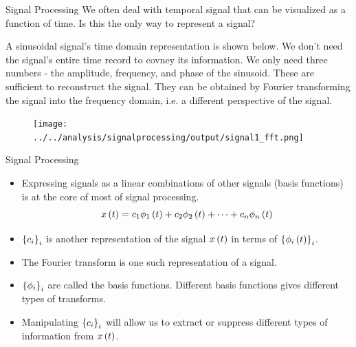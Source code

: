 \documentclass[aspectratio=169]{beamer}
\let\olditem\item
\renewcommand{\item}{\setlength{\itemsep}{\fill}\olditem}
\def\lp{\ensuremath\left(}
\def\rp{\ensuremath\right)}
\def\lc{\ensuremath\left\{}
\def\rc{\ensuremath\right\}}
\newcommand{\ct}[1]{\lp #1\rp}
\begin{document}
\begin{frame}{Signal Processing}
  We often deal with temporal signal that can be visualized as a function of time. Is this the only way to represent a signal?
  \vspace{0.2cm}

  A sinusoidal signal's time domain representation is shown below. We don't need the signal's entire time record to covney its information. We only need three numbers - the amplitude, frequency, and phase of the sinusoid. These are sufficient to reconstruct the signal. They can be obtained by Fourier transforming the signal into the frequency domain, i.e. a different perspective of the signal.
  \begin{figure}
    \centering
    \texttt{[image: ../../analysis/signalprocessing/output/signal1\_fft.png]}
  \end{figure}
\end{frame}


\begin{frame}{Signal Processing}
  \begin{itemize}
    \item Expressing signals as a linear combinations of other signals (basis functions) is at the core of most of signal processing.
    \[ x\ct{t} = c_1 \phi_1\ct{t} + c_2 \phi_2\ct{t} + \cdots + c_n \phi_n\ct{t} \]

    \item $\lc c_i \rc_{i}$ is another representation of the signal $x\ct{t}$ in terms of $\lc \phi_i\ct{t} \rc_i$.
    
    \item The Fourier transform is one such representation of a signal.
    
    \item $\lc \phi_i \rc_{i}$ are called the basis functions. Different basis functions gives different types of transforms.
    
    \item Manipulating $\lc c_i \rc_i$ will allow us to extract or suppress different types of information from $x\ct{t}$.
  \end{itemize}
\end{frame}


\end{document}
